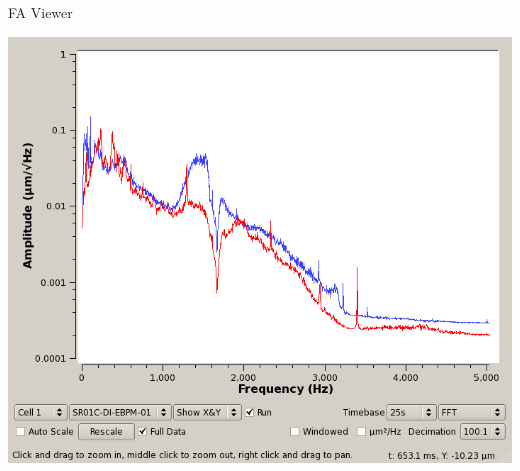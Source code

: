 \documentclass{beamer}
\begin{document}
%
\begin{frame}{FA Viewer}
\begin{center}
\includegraphics[width=.85\linewidth]{WEPMN004f6}
\end{center}
\end{frame}

\end{document}
